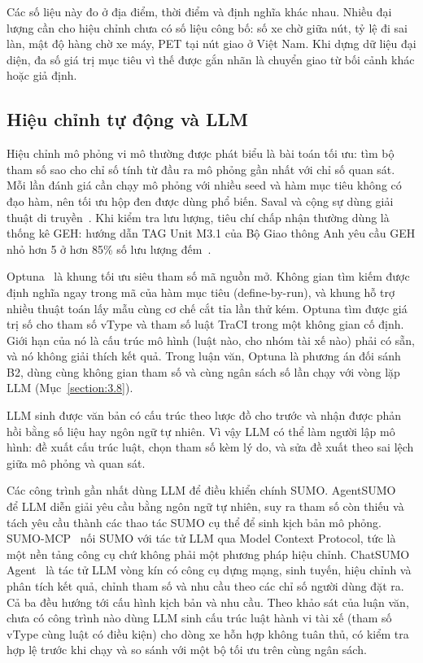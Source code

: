 \documentclass[../DoAn.tex]{subfiles}
\begin{document}
Các số liệu này đo ở địa điểm, thời điểm và định nghĩa khác nhau. Nhiều đại lượng cần cho hiệu chỉnh chưa có số liệu công bố: số xe chờ giữa nút, tỷ lệ đi sai làn, mật độ hàng chờ xe máy, PET tại nút giao ở Việt Nam. Khi dựng dữ liệu đại diện, đa số giá trị mục tiêu vì thế được gắn nhãn là chuyển giao từ bối cảnh khác hoặc giả định.

\subsection{Hiệu chỉnh tự động và LLM}
\label{subsection:2.1.4}

Hiệu chỉnh mô phỏng vi mô thường được phát biểu là bài toán tối ưu: tìm bộ tham số sao cho chỉ số tính từ đầu ra mô phỏng gần nhất với chỉ số quan sát. Mỗi lần đánh giá cần chạy mô phỏng với nhiều seed và hàm mục tiêu không có đạo hàm, nên tối ưu hộp đen được dùng phổ biến. Saval và cộng sự dùng giải thuật di truyền~\cite{saval2023mixed}. Khi kiểm tra lưu lượng, tiêu chí chấp nhận thường dùng là thống kê GEH: hướng dẫn TAG Unit M3.1 của Bộ Giao thông Anh yêu cầu GEH nhỏ hơn 5 ở hơn 85\% số lưu lượng đếm~\cite{dft2026tagm31}.

Optuna~\cite{akiba2019optuna} là khung tối ưu siêu tham số mã nguồn mở. Không gian tìm kiếm được định nghĩa ngay trong mã của hàm mục tiêu (define-by-run), và khung hỗ trợ nhiều thuật toán lấy mẫu cùng cơ chế cắt tỉa lần thử kém. Optuna tìm được giá trị số cho tham số vType và tham số luật TraCI trong một không gian cố định. Giới hạn của nó là cấu trúc mô hình (luật nào, cho nhóm tài xế nào) phải có sẵn, và nó không giải thích kết quả. Trong luận văn, Optuna là phương án đối sánh B2, dùng cùng không gian tham số và cùng ngân sách số lần chạy với vòng lặp LLM (Mục~\ref{section:3.8}).

LLM sinh được văn bản có cấu trúc theo lược đồ cho trước và nhận được phản hồi bằng số liệu hay ngôn ngữ tự nhiên. Vì vậy LLM có thể làm người lập mô hình: đề xuất cấu trúc luật, chọn tham số kèm lý do, và sửa đề xuất theo sai lệch giữa mô phỏng và quan sát.

Các công trình gần nhất dùng LLM để điều khiển chính SUMO. AgentSUMO~\cite{jeong2025agentsumo} để LLM diễn giải yêu cầu bằng ngôn ngữ tự nhiên, suy ra tham số còn thiếu và tách yêu cầu thành các thao tác SUMO cụ thể để sinh kịch bản mô phỏng. SUMO-MCP~\cite{ye2025sumomcp} nối SUMO với tác tử LLM qua Model Context Protocol, tức là một nền tảng công cụ chứ không phải một phương pháp hiệu chỉnh. ChatSUMO Agent~\cite{li2026chatsumo} là tác tử LLM vòng kín có công cụ dựng mạng, sinh tuyến, hiệu chỉnh và phân tích kết quả, chỉnh tham số và nhu cầu theo các chỉ số người dùng đặt ra. Cả ba đều hướng tới cấu hình kịch bản và nhu cầu. Theo khảo sát của luận văn, chưa có công trình nào dùng LLM sinh cấu trúc luật hành vi tài xế (tham số vType cùng luật có điều kiện) cho dòng xe hỗn hợp không tuân thủ, có kiểm tra hợp lệ trước khi chạy và so sánh với một bộ tối ưu trên cùng ngân sách.
\end{document}
